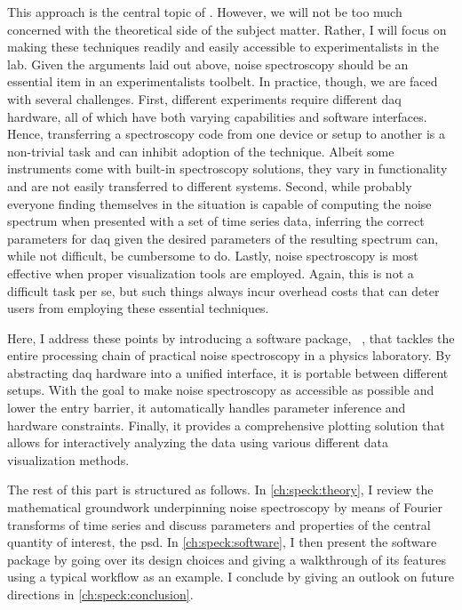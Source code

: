 This approach is the central topic of \thispart.
However, we will not be too much concerned with the theoretical side of the subject matter.
Rather, I will focus on making these techniques readily and easily accessible to experimentalists in the lab.
Given the arguments laid out above, noise spectroscopy should be an essential item in an experimentalists toolbelt.
In practice, though, we are faced with several challenges.
First, different experiments require different \gls{daq} hardware, all of which have both varying capabilities and software interfaces.
Hence, transferring a spectroscopy code from one device or setup to another is a non-trivial task and can inhibit adoption of the technique.
Albeit some instruments come with built-in spectroscopy solutions, they vary in functionality and are not easily transferred to different systems.
Second, while probably everyone finding themselves in the situation is capable of computing the noise spectrum when presented with a set of time series data, inferring the correct parameters for \acrlong{daq} given the desired parameters of the resulting spectrum can, while not difficult, be cumbersome to do.
Lastly, noise spectroscopy is most effective when proper visualization tools are employed.
Again, this is not a difficult task per se, but such things always incur overhead costs that can deter users from employing these essential techniques.

Here, I address these points by introducing a \python software package, \pyspeck~\cite{Hangleiter_pyspeck}, that tackles the entire processing chain of practical noise spectroscopy in a physics laboratory.
By abstracting \gls{daq} hardware into a unified interface, it is portable between different setups.
With the goal to make noise spectroscopy as accessible as possible and lower the entry barrier, it automatically handles parameter inference and hardware constraints.
Finally, it provides a comprehensive plotting solution that allows for interactively analyzing the data using various different data visualization methods.

The rest of this part is structured as follows.
In \cref{ch:speck:theory}, I review the mathematical groundwork underpinning noise spectroscopy by means of Fourier transforms of time series and discuss parameters and properties of the central quantity of interest, the \gls{psd}.
In \cref{ch:speck:software}, I then present the software package by going over its design choices and giving a walkthrough of its features using a typical workflow as an example.
I conclude by giving an outlook on future directions in \cref{ch:speck:conclusion}.
